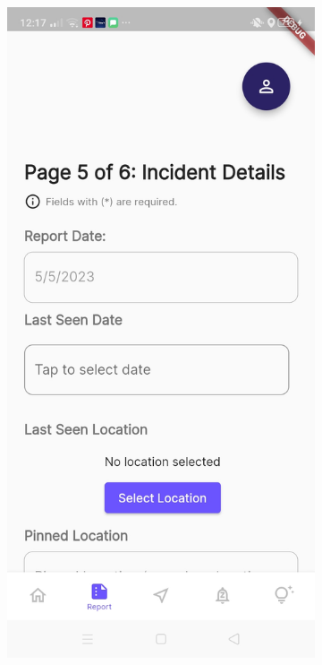 \begin{figure}[!h]
    \centering
    \begin{subfigure}[c]{0.30\linewidth}
        \centering
        \includegraphics[scale=0.15]{figures/Chapter4/Main/p5-1.jpg}

\end{subfigure}
\end{figure}
